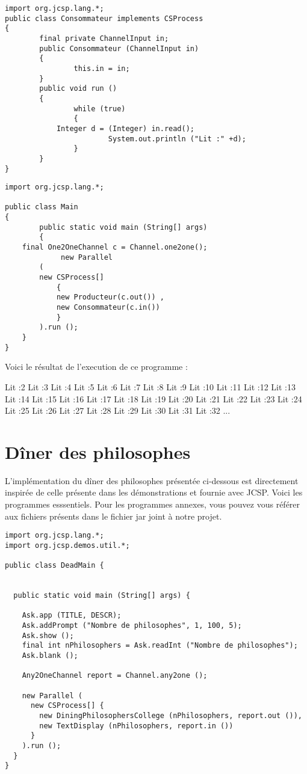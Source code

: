 \documentclass[a4paper,11pt,french]{report}
\begin{document}
\begin{lstlisting}[frame=trBL,title={Producteurs-Consommateurs: Consommateur.java}]
import org.jcsp.lang.*;
public class Consommateur implements CSProcess
{
        final private ChannelInput in;
        public Consommateur (ChannelInput in)
        {
                this.in = in;
        }
        public void run ()
        {
                while (true)
                {
			Integer d = (Integer) in.read();
                        System.out.println ("Lit :" +d);
                }
        }
}
\end{lstlisting}

\begin{lstlisting}[frame=trBL,title={Producteurs-Consommateurs: Main.java}]
import org.jcsp.lang.*;

public class Main
{
        public static void main (String[] args)
        {
	final One2OneChannel c = Channel.one2one();
             new Parallel
		(
		new CSProcess[]
			{
			new Producteur(c.out()) ,
			new Consommateur(c.in())
			} 
		).run ();
	}
}
\end{lstlisting}

Voici le résultat de l'execution de ce programme :

Lit :2
Lit :3
Lit :4
Lit :5
Lit :6
Lit :7
Lit :8
Lit :9
Lit :10
Lit :11
Lit :12
Lit :13
Lit :14
Lit :15
Lit :16
Lit :17
Lit :18
Lit :19
Lit :20
Lit :21
Lit :22
Lit :23
Lit :24
Lit :25
Lit :26
Lit :27
Lit :28
Lit :29
Lit :30
Lit :31
Lit :32
...

\section{Dîner des philosophes}

L'implémentation du dîner des philosophes présentée ci-dessous est directement inspirée de celle présente dans les démonstrations et fournie avec JCSP. Voici les programmes esssentiels. Pour les programmes annexes, vous pouvez vous référer aux fichiers présents dans le fichier jar joint à notre projet.

\begin{lstlisting}[frame=trBL,title={Dîner des philosophes : DeadMain.java}]
import org.jcsp.lang.*;
import org.jcsp.demos.util.*;

public class DeadMain {


  public static void main (String[] args) {

  	Ask.app (TITLE, DESCR);
  	Ask.addPrompt ("Nombre de philosophes", 1, 100, 5);
  	Ask.show ();
  	final int nPhilosophers = Ask.readInt ("Nombre de philosophes");
  	Ask.blank ();

    Any2OneChannel report = Channel.any2one ();

    new Parallel (
      new CSProcess[] {
        new DiningPhilosophersCollege (nPhilosophers, report.out ()),
        new TextDisplay (nPhilosophers, report.in ())
      }
    ).run ();
  }
}
\end{lstlisting}
\end{document}
